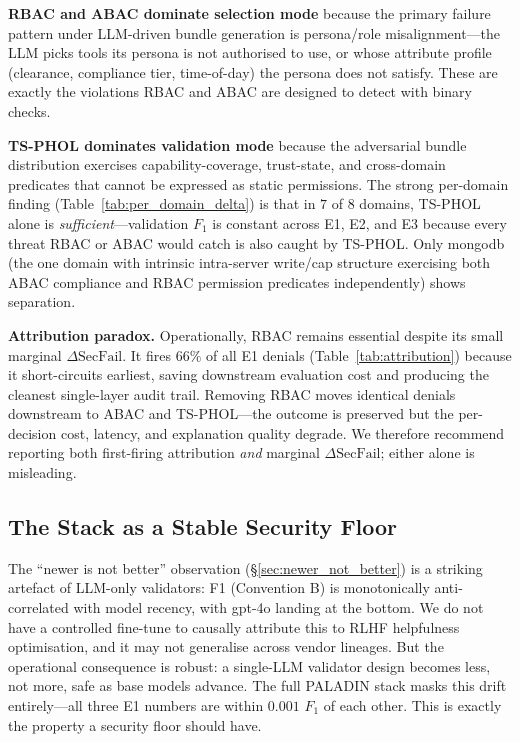 \documentclass[10pt,a4paper,twocolumn]{article}
\begin{document}
\textbf{RBAC and ABAC dominate selection mode} because the primary failure pattern under LLM-driven bundle generation is persona/role misalignment---the LLM picks tools its persona is not authorised to use, or whose attribute profile (clearance, compliance tier, time-of-day) the persona does not satisfy. These are exactly the violations RBAC and ABAC are designed to detect with binary checks.

\textbf{TS-PHOL dominates validation mode} because the adversarial bundle distribution exercises capability-coverage, trust-state, and cross-domain predicates that cannot be expressed as static permissions. The strong per-domain finding (Table~\ref{tab:per_domain_delta}) is that in $7$ of $8$ domains, TS-PHOL alone is \emph{sufficient}---validation $F_1$ is constant across E1, E2, and E3 because every threat RBAC or ABAC would catch is also caught by TS-PHOL. Only mongodb (the one domain with intrinsic intra-server write/cap structure exercising both ABAC compliance and RBAC permission predicates independently) shows separation.

\textbf{Attribution paradox.} Operationally, RBAC remains essential despite its small marginal $\Delta\mathrm{SecFail}$. It fires $66\%$ of all E1 denials (Table~\ref{tab:attribution}) because it short-circuits earliest, saving downstream evaluation cost and producing the cleanest single-layer audit trail. Removing RBAC moves identical denials downstream to ABAC and TS-PHOL---the outcome is preserved but the per-decision cost, latency, and explanation quality degrade. We therefore recommend reporting both first-firing attribution \emph{and} marginal $\Delta\mathrm{SecFail}$; either alone is misleading.

\subsection{The Stack as a Stable Security Floor}
\label{sec:stable_floor}

The ``newer is not better'' observation (\S\ref{sec:newer_not_better}) is a striking artefact of LLM-only validators: F1 (Convention B) is monotonically anti-correlated with model recency, with gpt-4o landing at the bottom. We do not have a controlled fine-tune to causally attribute this to RLHF helpfulness optimisation, and it may not generalise across vendor lineages. But the operational consequence is robust: a single-LLM validator design becomes less, not more, safe as base models advance. The full PALADIN stack masks this drift entirely---all three E1 numbers are within $0.001$ $F_1$ of each other. This is exactly the property a security floor should have.
\end{document}
